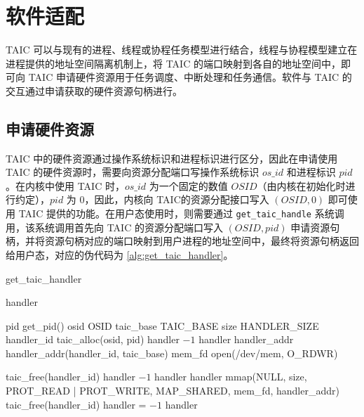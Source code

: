 \section{软件适配}

TAIC 可以与现有的进程、线程或协程任务模型进行结合，线程与协程模型建立在进程提供的地址空间隔离机制上，将 TAIC 的端口映射到各自的地址空间中，即可向 TAIC 申请硬件资源用于任务调度、中断处理和任务通信。软件与 TAIC 的交互通过申请获取的硬件资源句柄进行。

\subsection{申请硬件资源}

TAIC 中的硬件资源通过操作系统标识和进程标识进行区分，因此在申请使用 TAIC 的硬件资源时，需要向资源分配端口写操作系统标识 $os\_id$ 和进程标识 $pid$。在内核中使用 TAIC 时，$os\_id$ 为一个固定的数值 $OSID$（由内核在初始化时进行约定），$pid$ 为 0，因此，内核向 TAIC的资源分配接口写入 $(OSID, 0)$ 即可使用 TAIC 提供的功能。在用户态使用时，则需要通过 \verb|get_taic_handle| 系统调用，该系统调用首先向 TAIC 的资源分配端口写入 $(OSID, pid)$ 申请资源句柄，并将资源句柄对应的端口映射到用户进程的地址空间中，最终将资源句柄返回给用户态，对应的伪代码为 \ref{alg:get_taic_handler}。

\begin{algorithm}[!ht]
  \caption{get\_taic\_handler}
  \label{alg:get_taic_handler}
  \begin{algorithmic}[1]
    \Require
    \Ensure handler
    
    \State  pid \gets get\_pid()
    \State  osid \gets OSID
    \State  taic\_base \gets TAIC\_BASE
    \State  size \gets HANDLER\_SIZE
    \State  handler\_id \gets taic\_alloc(osid, pid) {}
        \State  handler \gets $-1$
        \Return handler
    \EndIf
    \State handler\_addr \gets handler\_addr(handler\_id, 
    \Statex \qquad \qquad \qquad \qquad \qquad \qquad taic\_base) {}
    \State mem\_fd \gets open(\textquotedbl/dev/mem\textquotedbl, O\_RDWR)

        \State taic\_free(handler\_id)
        \State handler \gets $-1$
        \Return handler
    \EndIf
    \State handler \gets mmap(NULL, size, 
    \Statex \qquad \qquad \qquad \qquad PROT\_READ | PROT\_WRITE, 
    \Statex \qquad \qquad \qquad \qquad MAP\_SHARED, 
    \Statex \qquad \qquad \qquad \qquad mem\_fd, handler\_addr) {}
        \State taic\_free(handler\_id)
        \State  handler = $-1$
    \EndIf
    \Return handler
  \end{algorithmic}
\end{algorithm}


